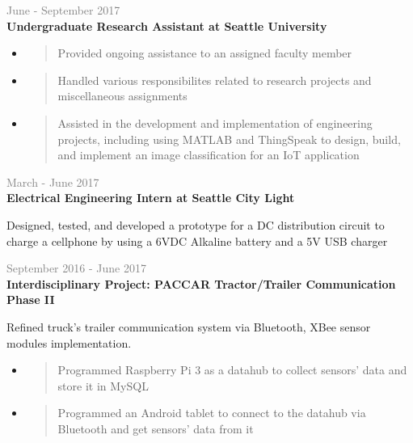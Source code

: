 \documentclass[letterpage]{article}
\begin{document}
\begin{minipage}[t]{0.63\linewidth}
\vspace{7px}
\textcolor{gray}{June - September 2017}\\
\textbf{\textsf{Undergraduate Research Assistant at Seattle University}}
\begin{itemize}[leftmargin=*,labelindent=1mm,labelsep=0mm]
\renewcommand\labelitemi{\rule[1mm]{0.33mm}{0.33mm}}
\renewcommand\labelitemii{$\blacksquare$}
\item
  \begin{quote}
  \raggedright
  Provided ongoing assistance to an assigned faculty member
  \end{quote}
\item
  \begin{quote}
  \raggedright
  Handled various responsibilites related to research projects and 
  miscellaneous assignments
  \end{quote}
\item
\begin{quote}
\raggedright
  Assisted in the development and implementation of engineering projects,
  including using MATLAB and ThingSpeak to design, build, and 
  implement an image classification for an IoT application
\end{quote}
\end{itemize}

\vspace{7px}
\textcolor{gray}{March - June 2017}\\
\textbf{\textsf{Electrical Engineering Intern at Seattle City Light}}\\
\raggedright
  Designed, tested, and developed a prototype for a DC distribution
  circuit to charge a cellphone by using a 6VDC Alkaline battery and
  a 5V USB charger

\vspace{7px}
\textcolor{gray}{September 2016 - June 2017}\\
\textbf{\textsf{Interdisciplinary Project:
		PACCAR Tractor/Trailer Communication Phase II}}\\
\raggedright
Refined truck's trailer communication system via Bluetooth, XBee
sensor modules implementation.
\begin{itemize}[leftmargin=*,labelindent=1mm,labelsep=0mm]
\renewcommand\labelitemi{\rule[1mm]{0.33mm}{0.33mm}}
\renewcommand\labelitemii{$\blacksquare$}
\item
  \begin{quote}
  \raggedright
  Programmed Raspberry Pi 3 as a datahub to collect sensors' data
  and store it in MySQL
  \end{quote}
\item
  \begin{quote}
  \raggedright
  Programmed an Android tablet to connect to the datahub via Bluetooth
  and get sensors' data from it
  \end{quote}
\end{itemize}



\end{minipage}
\end{document}
